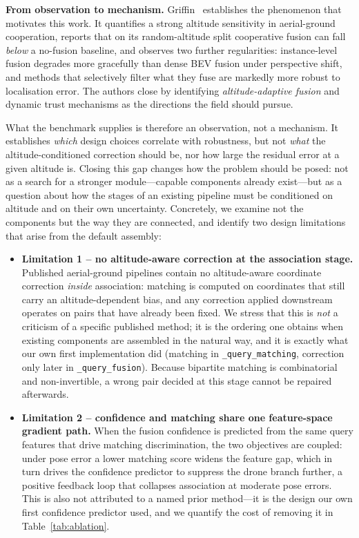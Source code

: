 \documentclass[9.5pt,twocolumn,a4paper]{IEEEtran}
\begin{document}
\textbf{From observation to mechanism.}
Griffin~\cite{griffin} establishes the phenomenon that motivates this work. It quantifies a strong altitude sensitivity in aerial-ground cooperation, reports that on its random-altitude split cooperative fusion can fall \emph{below} a no-fusion baseline, and observes two further regularities: instance-level fusion degrades more gracefully than dense BEV fusion under perspective shift, and methods that selectively filter what they fuse are markedly more robust to localisation error. The authors close by identifying \emph{altitude-adaptive fusion} and dynamic trust mechanisms as the directions the field should pursue.

What the benchmark supplies is therefore an observation, not a mechanism. It establishes \emph{which} design choices correlate with robustness, but not \emph{what} the altitude-conditioned correction should be, nor how large the residual error at a given altitude is. Closing this gap changes how the problem should be posed: not as a search for a stronger module---capable components already exist---but as a question about how the stages of an existing pipeline must be conditioned on altitude and on their own uncertainty. Concretely, we examine not the components but the way they are connected, and identify two design limitations that arise from the default assembly:

\begin{itemize}
    \item \textbf{Limitation 1 -- no altitude-aware correction at the association stage.} Published aerial-ground pipelines contain no altitude-aware coordinate correction \emph{inside} association: matching is computed on coordinates that still carry an altitude-dependent bias, and any correction applied downstream operates on pairs that have already been fixed. We stress that this is \emph{not} a criticism of a specific published method; it is the ordering one obtains when existing components are assembled in the natural way, and it is exactly what our own first implementation did (matching in \texttt{\_query\_matching}, correction only later in \texttt{\_query\_fusion}). Because bipartite matching is combinatorial and non-invertible, a wrong pair decided at this stage cannot be repaired afterwards.
    \item \textbf{Limitation 2 -- confidence and matching share one feature-space gradient path.} When the fusion confidence is predicted from the same query features that drive matching discrimination, the two objectives are coupled: under pose error a lower matching score widens the feature gap, which in turn drives the confidence predictor to suppress the drone branch further, a positive feedback loop that collapses association at moderate pose errors. This is also not attributed to a named prior method---it is the design our own first confidence predictor used, and we quantify the cost of removing it in Table~\ref{tab:ablation}.
\end{itemize}
\end{document}
